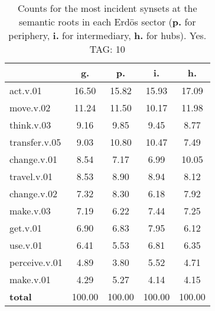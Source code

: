 \begin{table}[h!]
\begin{center}
\begin{tabular}{| l | c | c | c | c |}\hline
 & g. & p. & i. & h. \\\hline
act.v.01 & 16.50  & 15.82  & 15.93  & 17.09 \\\hline
move.v.02 & 11.24  & 11.50  & 10.17  & 11.98 \\\hline
think.v.03 & 9.16  & 9.85  & 9.45  & 8.77 \\\hline
transfer.v.05 & 9.03  & 10.80  & 10.47  & 7.49 \\\hline
change.v.01 & 8.54  & 7.17  & 6.99  & 10.05 \\\hline
travel.v.01 & 8.53  & 8.90  & 8.94  & 8.12 \\\hline
change.v.02 & 7.32  & 8.30  & 6.18  & 7.92 \\\hline
make.v.03 & 7.19  & 6.22  & 7.44  & 7.25 \\\hline
get.v.01 & 6.90  & 6.83  & 7.95  & 6.12 \\\hline
use.v.01 & 6.41  & 5.53  & 6.81  & 6.35 \\\hline
perceive.v.01 & 4.89  & 3.80  & 5.52  & 4.71 \\\hline
make.v.01 & 4.29  & 5.27  & 4.14  & 4.15 \\\hline
{{\bf total}} & 100.00  & 100.00  & 100.00  & 100.00 \\\hline
\end{tabular}
\caption{Counts for the most incident synsets at the semantic roots in each Erd\"os sector ({\bf p.} for periphery, {\bf i.} for intermediary, {\bf h.} for hubs). Yes. TAG: 10}
\end{center}
\end{table}